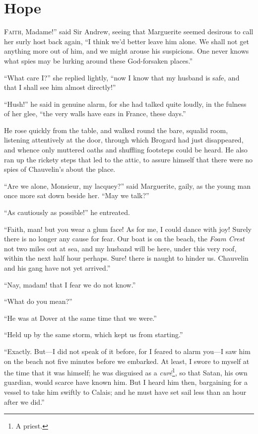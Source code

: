 
\chapter{Hope}
\lettrine[ante=``,lines=4]{F}{aith}, Madame!'' said Sir Andrew, seeing that Marguerite seemed desirous to call her surly host back again, \enquote{I think we'd better leave him alone. We shall not get anything more out of him, and we might arouse his suspicions. One never knows what spies may be lurking around these God-forsaken places.}

\enquote{What care I?} she replied lightly, \enquote{now I know that my husband is safe, and that I shall see him almost directly!}

\enquote{Hush!} he said in genuine alarm, for she had talked quite loudly, in the fulness of her glee, \enquote{the very walls have ears in France, these days.}

He rose quickly from the table, and walked round the bare, squalid room, listening attentively at the door, through which Brogard had just disappeared, and whence only muttered oaths and shuffling footsteps could be heard. He also ran up the rickety steps that led to the attic, to assure himself that there were no spies of Chauvelin's about the place.

\enquote{Are we alone, Monsieur, my lacquey?} said Marguerite, gaily, as the young man once more sat down beside her. \enquote{May we talk?}

\enquote{As cautiously as possible!} he entreated.

\enquote{Faith, man! but you wear a glum face! As for me, I could dance with joy! Surely there is no longer any cause for fear. Our boat is on the beach, the \textit{Foam Crest} not two miles out at sea, and my husband will be here, under this very roof, within the next half hour perhaps. Sure! there is naught to hinder us. Chauvelin and his gang have not yet arrived.}

\enquote{Nay, madam! that I fear we do not know.}

\enquote{What do you mean?}

\enquote{He was at Dover at the same time that we were.}

\enquote{Held up by the same storm, which kept us from starting.}

\enquote{Exactly. But---I did not speak of it before, for I feared to alarm you---I saw him on the beach not five minutes before we embarked. At least, I swore to myself at the time that it was himself; he was disguised as a \textit{curé}\footnote{A priest.}, so that Satan, his own guardian, would scarce have known him. But I heard him then, bargaining for a vessel to take him swiftly to Calais; and he must have set sail less than an hour after we did.}

